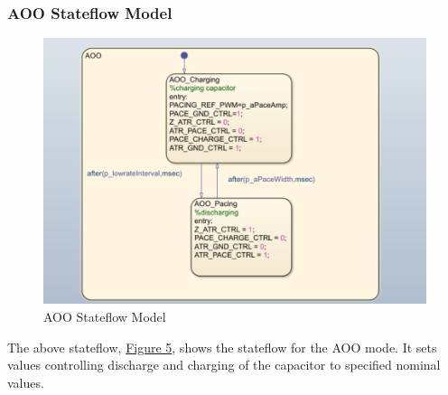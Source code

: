 \documentclass{article}
\begin{document}
\newpage
\subsubsection{AOO Stateflow Model}
\begin{tcolorbox}
    \begin{figure}[H]
        \includegraphics[width=\textwidth]{AOO.png}
        \caption{AOO Stateflow Model}
        \label{AOOSF}
    \end{figure}
\end{tcolorbox}
The above stateflow, \hyperref[AOOSF]{Figure 5}, shows the stateflow for the AOO mode. It sets values 
controlling discharge and charging of the capacitor to specified nominal values.

\newpage
\end{document}
